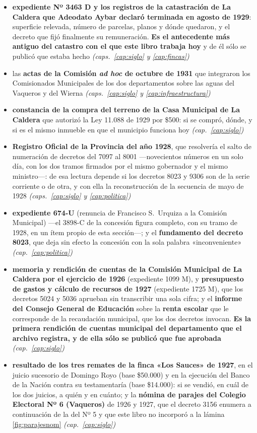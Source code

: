 \begin{itemize}[leftmargin=*]
\item \textbf{expediente Nº 3463 D y los registros de la catastración de La Caldera que Adeodato Aybar declaró terminada en agosto de 1929}: superficie relevada, número de parcelas, planos y dónde quedaron, y el decreto que fijó finalmente su remuneración. \textbf{Es el antecedente más antiguo del catastro con el que este libro trabaja hoy} y de él sólo se publicó que estaba hecho \textit{(caps.\ \ref{cap:siglo} y \ref{cap:fincas})}
\item las \textbf{actas de la Comisión \textit{ad hoc} de octubre de 1931} que integraron los Comisionados Municipales de los dos departamentos sobre las aguas del Vaqueros y del Wierna \textit{(caps.\ \ref{cap:siglo} y \ref{cap:infraestructura})}
\item \textbf{constancia de la compra del terreno de la Casa Municipal de La Caldera} que autorizó la Ley 11.088 de 1929 por \$500: si se compró, dónde, y si es el mismo inmueble en que el municipio funciona hoy \textit{(cap.\ \ref{cap:siglo})}
\item \textbf{Registro Oficial de la Provincia del año 1928}, que resolvería el salto de numeración de decretos del 7097 al 8001 ---novecientos números en un solo día, con los dos tramos firmados por el mismo gobernador y el mismo ministro---: de esa lectura depende si los decretos 8023 y 9306 son de la serie corriente o de otra, y con ella la reconstrucción de la secuencia de mayo de 1928 \textit{(caps.\ \ref{cap:siglo} y \ref{cap:politica})}
\item \textbf{expediente 674-U} (renuncia de Francisco S.\ Urquiza a la Comisión Municipal) ---el 3898-C de la concesión figura completo, con su tramo de 1928, en un ítem propio de esta sección---; y el \textbf{fundamento del decreto 8023}, que deja sin efecto la concesión con la sola palabra «inconveniente» \textit{(cap.\ \ref{cap:politica})}
\item \textbf{memoria y rendición de cuentas de la Comisión Municipal de La Caldera por el ejercicio de 1926} (expediente 1099 M), y \textbf{presupuesto de gastos y cálculo de recursos de 1927} (expediente 1725 M), que los decretos 5024 y 5036 aprueban sin transcribir una sola cifra; y el \textbf{informe del Consejo General de Educación} sobre la \textbf{renta escolar} que le corresponde de la recaudación municipal, que los dos decretos invocan. \textbf{Es la primera rendición de cuentas municipal del departamento que el archivo registra, y de ella sólo se publicó que fue aprobada} \textit{(cap.\ \ref{cap:siglo})}
\item \textbf{resultado de los tres remates de la finca «Los Sauces» de 1927}, en el juicio sucesorio de Domingo Royo (base \$50.000) y en la ejecución del Banco de la Nación contra su testamentaría (base \$14.000): si se vendió, en cuál de los dos juicios, a quién y en cuánto; y la \textbf{nómina de parajes del Colegio Electoral Nº 6 (Vaqueros)} de 1926 y 1927, que el decreto 3156 enumera a continuación de la del Nº 5 y que este libro no incorporó a la lámina \ref{fig:parajesnom} \textit{(cap.\ \ref{cap:siglo})}

\end{itemize}
